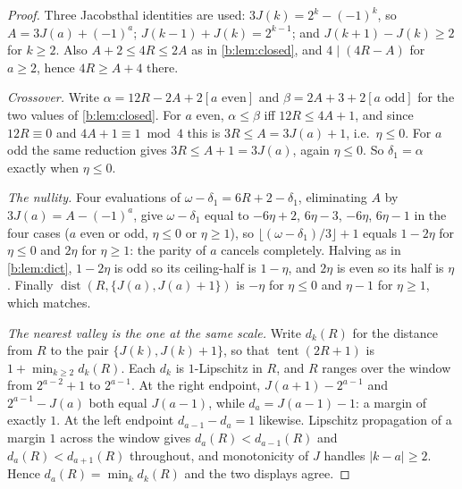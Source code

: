 \documentclass[11pt]{amsart}
\theoremstyle{definition}
\theoremstyle{remark}
\begin{document}
\begin{proof}
Three Jacobsthal identities are used: $3J(k) = 2^k - (-1)^k$, so $A = 3J(a) + (-1)^a$; $J(k-1) + J(k) = 2^{k-1}$; and $J(k+1) - J(k) \ge 2$ for $k \ge 2$. Also $A + 2 \le 4R \le 2A$ as in \cref{b:lem:closed}, and $4 \mid (4R-A)$ for $a \ge 2$, hence $4R \ge A+4$ there.

\emph{Crossover.} Write $\alpha = 12R - 2A + 2[a \text{ even}]$ and $\beta = 2A+3+2[a \text{ odd}]$ for the two values of \cref{b:lem:closed}. For $a$ even, $\alpha \le \beta$ iff $12R \le 4A+1$, and since $12R \equiv 0$ and $4A+1 \equiv 1 \bmod 4$ this is $3R \le A = 3J(a)+1$, i.e.\ $\eta \le 0$. For $a$ odd the same reduction gives $3R \le A+1 = 3J(a)$, again $\eta \le 0$. So $\delta_1 = \alpha$ exactly when $\eta \le 0$.

\emph{The nullity.} Four evaluations of $\omega - \delta_1 = 6R+2-\delta_1$, eliminating $A$ by $3J(a) = A - (-1)^a$, give $\omega - \delta_1$ equal to $-6\eta+2$, $6\eta-3$, $-6\eta$, $6\eta-1$ in the four cases ($a$ even or odd, $\eta \le 0$ or $\eta \ge 1$), so $\lfloor (\omega-\delta_1)/3 \rfloor + 1$ equals $1-2\eta$ for $\eta \le 0$ and $2\eta$ for $\eta \ge 1$: the parity of $a$ cancels completely. Halving as in \cref{b:lem:dict}, $1-2\eta$ is odd so its ceiling-half is $1-\eta$, and $2\eta$ is even so its half is $\eta$. Finally $\operatorname{dist}(R,\{J(a),J(a)+1\})$ is $-\eta$ for $\eta \le 0$ and $\eta-1$ for $\eta \ge 1$, which matches.

\emph{The nearest valley is the one at the same scale.} Write $d_k(R)$ for the distance from $R$ to the pair $\{J(k), J(k)+1\}$, so that $\operatorname{tent}(2R+1)$ is $1 + \min_{k \ge 2} d_k(R)$. Each $d_k$ is $1$-Lipschitz in $R$, and $R$ ranges over the window from $2^{a-2}+1$ to $2^{a-1}$. At the right endpoint, $J(a+1) - 2^{a-1}$ and $2^{a-1} - J(a)$ both equal $J(a-1)$, while $d_a = J(a-1) - 1$: a margin of exactly $1$. At the left endpoint $d_{a-1} - d_a = 1$ likewise. Lipschitz propagation of a margin $1$ across the window gives $d_a(R) < d_{a-1}(R)$ and $d_a(R) < d_{a+1}(R)$ throughout, and monotonicity of $J$ handles $|k - a| \ge 2$. Hence $d_a(R) = \min_k d_k(R)$ and the two displays agree.
\end{proof}
\end{document}

